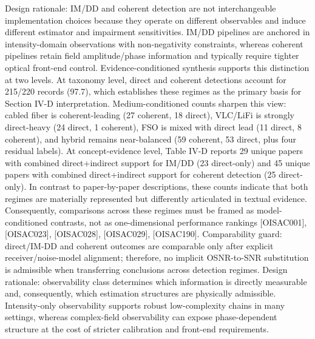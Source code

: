 {}\markdownRendererSectionBegin
{}\markdownRendererInterblockSeparator
{}Design rationale: IM/DD and coherent detection are not interchangeable implementation choices because they operate on different observables and induce different estimator and impairment sensitivities. IM/DD pipelines are anchored in intensity-domain observations with non-negativity constraints, whereas coherent pipelines retain field amplitude/phase information and typically require tighter optical front-end control.\markdownRendererParagraphSeparator
{}Evidence-conditioned synthesis supports this distinction at two levels. At taxonomy level, direct and coherent detections account for 215/220 records (97.7\markdownRendererPercentSign{}), which establishes these regimes as the primary basis for Section IV-D interpretation. Medium-conditioned counts sharpen this view: cabled fiber is coherent-leading (27 coherent, 18 direct), VLC/LiFi is strongly direct-heavy (24 direct, 1 coherent), FSO is mixed with direct lead (11 direct, 8 coherent), and hybrid remains near-balanced (59 coherent, 53 direct, plus four residual labels). At concept-evidence level, Table IV-D reports 29 unique papers with combined direct+indirect support for IM/DD (23 direct-only) and 45 unique papers with combined direct+indirect support for coherent detection (25 direct-only). In contrast to paper-by-paper descriptions, these counts indicate that both regimes are materially represented but differently articulated in textual evidence. Consequently, comparisons across these regimes must be framed as model-conditioned contrasts, not as one-dimensional performance rankings [O\markdownRendererUnderscore{}ISAC\markdownRendererUnderscore{}001], [O\markdownRendererUnderscore{}ISAC\markdownRendererUnderscore{}023], [O\markdownRendererUnderscore{}ISAC\markdownRendererUnderscore{}028], [O\markdownRendererUnderscore{}ISAC\markdownRendererUnderscore{}029], [O\markdownRendererUnderscore{}ISAC\markdownRendererUnderscore{}190].\markdownRendererParagraphSeparator
{}Comparability guard: direct/IM-DD and coherent outcomes are comparable only after explicit receiver/noise-model alignment; therefore, no implicit OSNR-to-SNR substitution is admissible when transferring conclusions across detection regimes.\markdownRendererInterblockSeparator
{}
\markdownRendererSectionEnd \markdownRendererSectionBegin
{}\markdownRendererInterblockSeparator
{}Design rationale: observability class determines which information is directly measurable and, consequently, which estimation structures are physically admissible. Intensity-only observability supports robust low-complexity chains in many settings, whereas complex-field observability can expose phase-dependent structure at the cost of stricter calibration and front-end requirements.\markdownRendererParagraphSeparator
